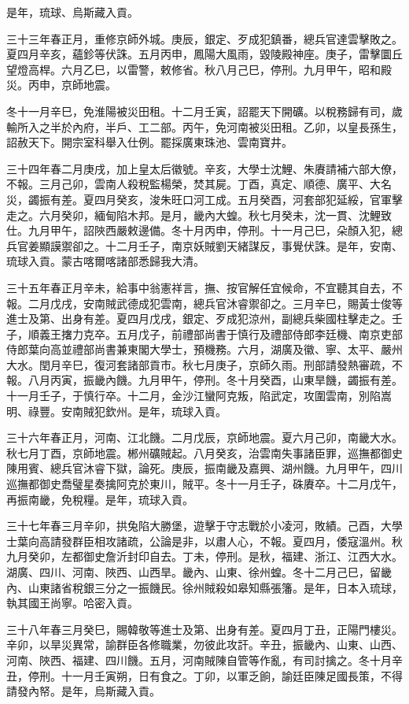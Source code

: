 \begin{pinyinscope}
是年，琉球、烏斯藏入貢。

三十三年春正月，重修京師外城。庚辰，銀定、歹成犯鎮番，總兵官達雲擊敗之。夏四月辛亥，蘊鉁等伏誅。五月丙申，鳳陽大風雨，毀陵殿神座。庚子，雷擊圜丘望燈高桿。六月乙巳，以雷警，敕修省。秋八月己巳，停刑。九月甲午，昭和殿災。丙申，京師地震。

冬十一月辛巳，免淮陽被災田租。十二月壬寅，詔罷天下開礦。以稅務歸有司，歲輸所入之半於內府，半戶、工二部。丙午，免河南被災田租。乙卯，以皇長孫生，詔赦天下。開宗室科舉入仕例。罷採廣東珠池、雲南寶井。

三十四年春二月庚戌，加上皇太后徽號。辛亥，大學士沈鯉、朱賡請補六部大僚，不報。三月己卯，雲南人殺稅監楊榮，焚其屍。丁酉，真定、順德、廣平、大名災，蠲振有差。夏四月癸亥，浚朱旺口河工成。五月癸酉，河套部犯延綏，官軍擊走之。六月癸卯，緬甸陷木邦。是月，畿內大蝗。秋七月癸未，沈一貫、沈鯉致仕。九月甲午，詔陜西嚴敕邊備。冬十月丙申，停刑。十一月己巳，朵顏入犯，總兵官姜顯謨禦卻之。十二月壬子，南京妖賊劉天緒謀反，事覺伏誅。是年，安南、琉球入貢。蒙古喀爾喀諸部悉歸我大清。

三十五年春正月辛未，給事中翁憲祥言，撫、按官解任宜候命，不宜聽其自去，不報。二月戊戌，安南賊武德成犯雲南，總兵官沐睿禦卻之。三月辛巳，賜黃士俊等進士及第、出身有差。夏四月戊戌，銀定、歹成犯涼州，副總兵柴國柱擊走之。壬子，順義王撦力克卒。五月戊子，前禮部尚書于慎行及禮部侍郎李廷機、南京吏部侍郎葉向高並禮部尚書兼東閣大學士，預機務。六月，湖廣及徽、寧、太平、嚴州大水。閏月辛巳，復河套諸部貢市。秋七月庚子，京師久雨。刑部請發熱審疏，不報。八月丙寅，振畿內饑。九月甲午，停刑。冬十月癸酉，山東旱饑，蠲振有差。十一月壬子，于慎行卒。十二月，金沙江蠻阿克叛，陷武定，攻圍雲南，別陷嵩明、祿豐。安南賊犯欽州。是年，琉球入貢。

三十六年春正月，河南、江北饑。二月戊辰，京師地震。夏六月己卯，南畿大水。秋七月丁酉，京師地震。郴州礦賊起。八月癸亥，治雲南失事諸臣罪，巡撫都御史陳用賓、總兵官沐睿下獄，論死。庚辰，振南畿及嘉興、湖州饑。九月甲午，四川巡撫都御史喬璧星奏擒阿克於東川，賊平。冬十一月壬子，硃賡卒。十二月戊午，再振南畿，免稅糧。是年，琉球入貢。

三十七年春三月辛卯，拱兔陷大勝堡，遊擊于守志戰於小凌河，敗績。己酉，大學士葉向高請發群臣相攻諸疏，公論是非，以肅人心，不報。夏四月，倭寇溫州。秋九月癸卯，左都御史詹沂封印自去。丁未，停刑。是秋，福建、浙江、江西大水。湖廣、四川、河南、陜西、山西旱。畿內、山東、徐州蝗。冬十二月己巳，留畿內、山東諸省稅銀三分之一振饑民。徐州賊殺如皋知縣張籓。是年，日本入琉球，執其國王尚寧。哈密入貢。

三十八年春三月癸巳，賜韓敬等進士及第、出身有差。夏四月丁丑，正陽門樓災。辛卯，以旱災異常，諭群臣各修職業，勿彼此攻訐。辛丑，振畿內、山東、山西、河南、陜西、福建、四川饑。五月，河南賊陳自管等作亂，有司討擒之。冬十月辛丑，停刑。十一月壬寅朔，日有食之。丁卯，以軍乏餉，諭廷臣陳足國長策，不得請發內帑。是年，烏斯藏入貢。


\end{pinyinscope}
